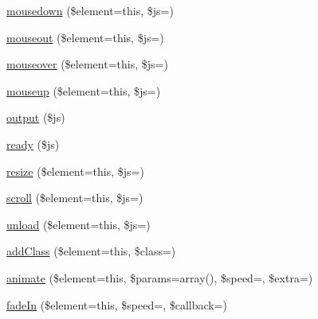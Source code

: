 \begin{DoxyCompactItemize}
\item 
\mbox{\hyperlink{class_c_i___javascript_aed25f3d7f9415ba41edd4547d8e0c040}{mousedown}} (\$element=\textquotesingle{}this\textquotesingle{}, \$js=\textquotesingle{}\textquotesingle{})
\item 
\mbox{\hyperlink{class_c_i___javascript_a2c5c075a2e381b8a963c093febadb81b}{mouseout}} (\$element=\textquotesingle{}this\textquotesingle{}, \$js=\textquotesingle{}\textquotesingle{})
\item 
\mbox{\hyperlink{class_c_i___javascript_a776db379fd9e0343780ad15f2cb5ea54}{mouseover}} (\$element=\textquotesingle{}this\textquotesingle{}, \$js=\textquotesingle{}\textquotesingle{})
\item 
\mbox{\hyperlink{class_c_i___javascript_a6eea55e5b64f7b74ff550c45e6ebabe1}{mouseup}} (\$element=\textquotesingle{}this\textquotesingle{}, \$js=\textquotesingle{}\textquotesingle{})
\item 
\mbox{\hyperlink{class_c_i___javascript_a95de084a2a79ab6d373b6a28b3978f05}{output}} (\$js)
\item 
\mbox{\hyperlink{class_c_i___javascript_a5a91133b6ea3bbf7b1b0b41bcaa93245}{ready}} (\$js)
\item 
\mbox{\hyperlink{class_c_i___javascript_adad742ea208e54b0266b221965f27989}{resize}} (\$element=\textquotesingle{}this\textquotesingle{}, \$js=\textquotesingle{}\textquotesingle{})
\item 
\mbox{\hyperlink{class_c_i___javascript_a0499c5c8ae176041f0e2b62fcced1590}{scroll}} (\$element=\textquotesingle{}this\textquotesingle{}, \$js=\textquotesingle{}\textquotesingle{})
\item 
\mbox{\hyperlink{class_c_i___javascript_a8ce9d9943792e62bc8145f264d79ef86}{unload}} (\$element=\textquotesingle{}this\textquotesingle{}, \$js=\textquotesingle{}\textquotesingle{})
\item 
\mbox{\hyperlink{class_c_i___javascript_ac9eb640c56f05ed0a4d409c90bbd2603}{add\+Class}} (\$element=\textquotesingle{}this\textquotesingle{}, \$class=\textquotesingle{}\textquotesingle{})
\item 
\mbox{\hyperlink{class_c_i___javascript_ae82cd02d4438371a86d1663093547e4d}{animate}} (\$element=\textquotesingle{}this\textquotesingle{}, \$params=array(), \$speed=\textquotesingle{}\textquotesingle{}, \$extra=\textquotesingle{}\textquotesingle{})
\item 
\mbox{\hyperlink{class_c_i___javascript_a81a5b1bcd92a4077efd0102ea21bae62}{fade\+In}} (\$element=\textquotesingle{}this\textquotesingle{}, \$speed=\textquotesingle{}\textquotesingle{}, \$callback=\textquotesingle{}\textquotesingle{})

\end{DoxyCompactItemize}

